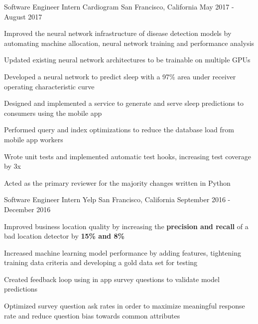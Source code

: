 


\begin{cventries}


\cventry
{Software Engineer Intern}
{Cardiogram}
{San Francisco, California}
{May 2017 - August 2017}
{ %
\begin{cvitems}
\item {Improved the neural network infrastructure of disease detection models by automating machine allocation, neural network training and performance analysis}
\item {Updated existing neural network architectures to be trainable on multiple GPUs}
\item {Developed a neural network to predict sleep with a 97\% area under receiver operating characteristic curve}
\item {Designed and implemented a service to generate and serve sleep predictions to consumers using the mobile app}
\item {Performed query and index optimizations to reduce the database load from mobile app workers}
\item {Wrote unit tests and implemented automatic test hooks, increasing test coverage by 3x}
\item {Acted as the primary reviewer for the majority changes written in Python}
\end{cvitems}
}


\cventry
{Software Engineer Intern}
{Yelp}
{San Francisco, California}
{September 2016 - December 2016}
{ %
\begin{cvitems}
\item {Improved business location quality by increasing the \textbf{precision and recall} of a bad location detector by \textbf{15\% and 8\%}}
\item {Increased machine learning model performance by adding features, tightening training data criteria and developing a gold data set for testing}
\item {Created feedback loop using in app survey questions to validate model predictions}
\item {Optimized survey question ask rates in order to maximize meaningful response rate and reduce question bias towards common attributes}
\end{cvitems}
}


\end{cventries}
